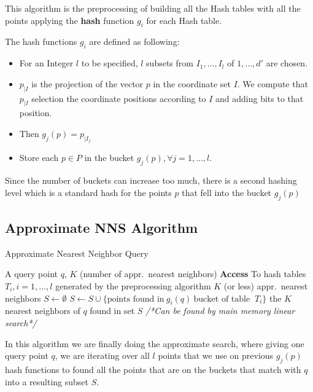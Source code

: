 \documentclass[12pt, a4paper]{article}
\theoremstyle{definition}
\begin{document}
   This algorithm is the preprocessing of building all the Hash tables with all the points applying the \textbf{hash} function $g_i$ for each Hash table.

   The hash functions $g_i$ are defined as following:

   \begin{itemize}
     \item For an Integer $l$ to be specified, $l$ subsets from $I_1, \dots, I_l$ of ${1, \dots, d'}$ are chosen.
     \item $p_{|I}$ is the projection of the vector $p$ in the coordinate set $I$. We compute that $p_{|I}$ selection the coordinate positions according to $I$ and adding bits to that position.
     \item Then $g_j(p) = p_{|I_j}$
     \item Store each $p \in P$ in the bucket $g_j(p), \forall j = 1, \dots, l$.
  \end{itemize}

  Since the number of buckets can increase too much, there is a second hashing level which is a standard hash for the points $p$ that fell into the bucket $g_j(p)$

\subsection{Approximate NNS Algorithm}

\begin{algorithm}[H]
  \label{algo:nns}
  \caption{Approximate Nearest Neighbor Query}
  \begin{algorithmic}
  \REQUIRE A query point $q$,
  \STATE $K$ (number of appr.\ nearest neighbors)
  \STATE \textbf{Access} To hash tables $T_i, i = 1, \dots, l$ generated by the preprocessing algorithm
  \ENSURE $K$ (or less) appr.\ nearest neighbors
  \STATE $S \leftarrow \emptyset$
    \STATE $S \leftarrow S \cup \{ \text{points found in}\ g_i(q)\ \text{bucket of table }\ T_i\}$
  \ENDFOR
  \RETURN the $K$ nearest neighbors of $q$ found in set $S$
  \STATE \textit{/*Can be found by main memory linear search*/}
  \end{algorithmic}
\end{algorithm}

In this algorithm we are finally doing the approximate search, where giving one query point $q$, we are iterating over all $l$ points that we use on previous $g_j(p)$ hash functions to found all the points that are on the buckets that match with $q$ into a resulting subset $S$.
\end{document}
